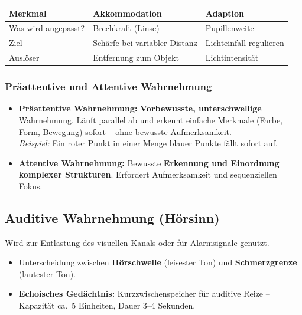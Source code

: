 \documentclass[12pt, a4paper]{article}
\begin{document}
\begin{center}
\begin{tabular}{p{3cm} p{5cm} p{5cm}}
\hline
\textbf{Merkmal} & \textbf{Akkommodation} & \textbf{Adaption} \\
\hline
Was wird angepasst? & Brechkraft (Linse)            & Pupillenweite \\[3pt]
Ziel                & Schärfe bei variabler Distanz & Lichteinfall regulieren \\[3pt]
Auslöser            & Entfernung zum Objekt         & Lichtintensität \\
\hline
\end{tabular}
\end{center}

\subsubsection{Präattentive und Attentive Wahrnehmung}

\begin{itemize}
  \item \textbf{Präattentive Wahrnehmung:} \textbf{Vorbewusste, unterschwellige}
        Wahrnehmung. Läuft parallel ab und erkennt einfache Merkmale (Farbe, Form,
        Bewegung) sofort -- ohne bewusste Aufmerksamkeit.\\
        \textit{Beispiel:} Ein roter Punkt in einer Menge blauer Punkte fällt sofort
        auf.
  \item \textbf{Attentive Wahrnehmung:} Bewusste \textbf{Erkennung und Einordnung
        komplexer Strukturen}. Erfordert Aufmerksamkeit und sequenziellen Fokus.
\end{itemize}

\subsection{Auditive Wahrnehmung (Hörsinn)}

Wird zur Entlastung des visuellen Kanals oder für Alarmsignale genutzt.

\begin{itemize}
  \item Unterscheidung zwischen \textbf{Hörschwelle} (leisester Ton) und
        \textbf{Schmerzgrenze} (lautester Ton).
  \item \textbf{Echoisches Gedächtnis:} Kurzzwischenspeicher für auditive Reize --
        Kapazität ca.\ 5 Einheiten, Dauer 3--4 Sekunden.
\end{itemize}
\end{document}
